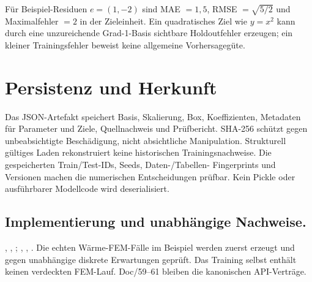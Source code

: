 Für Beispiel-Residuen $e=(1,-2)$ sind MAE $=1{,}5$,
RMSE $=\sqrt{5/2}$ und Maximalfehler $=2$ in der Zieleinheit.
Ein quadratisches Ziel wie $y=x^2$ kann durch eine unzureichende Grad-1-Basis
sichtbare Holdoutfehler erzeugen; ein kleiner Trainingsfehler beweist keine
allgemeine Vorhersagegüte.

\section{Persistenz und Herkunft}
Das JSON-Artefakt speichert Basis, Skalierung, Box, Koeffizienten,
Metadaten für Parameter und Ziele, Quellnachweis und Prüfbericht.
SHA-256 schützt gegen unbeabsichtigte Beschädigung, nicht absichtliche
Manipulation. Strukturell gültiges Laden rekonstruiert keine historischen
Trainingsnachweise. Die gespeicherten Train/Test-IDs, Seeds, Daten-/Tabellen-
Fingerprints und Versionen machen die numerischen Entscheidungen prüfbar.
Kein Pickle oder ausführbarer Modellcode wird deserialisiert.

\subsection*{Implementierung und unabhängige Nachweise.}
{\small\raggedright
{},
,
;
,
,
.
Die echten Wärme-FEM-Fälle im Beispiel werden zuerst erzeugt und gegen
unabhängige diskrete Erwartungen geprüft. Das Training selbst enthält
keinen verdeckten FEM-Lauf. Doc/59--61 bleiben die kanonischen API-Verträge.

\par}
